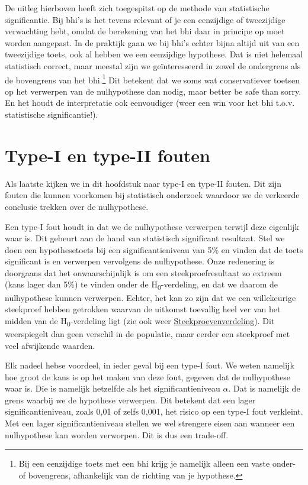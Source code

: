 \documentclass[
  letterpaper,
  DIV=11,
  numbers=noendperiod]{scrreprt}
\begin{document}
De uitleg hierboven heeft zich toegespitst op de methode van
statistische significantie. Bij bhi's is het tevens relevant of je een
eenzijdige of tweezijdige verwachting hebt, omdat de berekening van het
bhi daar in principe op moet worden aangepast. In de praktijk gaan we
bij bhi's echter bijna altijd uit van een tweezijdige toets, ook al
hebben we een eenzijdige hypothese. Dat is niet helemaal statistisch
correct, maar meestal zijn we geïnteresseerd in zowel de ondergrens als
de bovengrens van het bhi.\footnote{Bij een eenzijdige toets met een bhi
  krijg je namelijk alleen een vaste onder- of bovengrens, afhankelijk
  van de richting van je hypothese.} Dit betekent dat we soms wat
conservatiever toetsen op het verwerpen van de nulhypothese dan nodig,
maar better be safe than sorry. En het houdt de interpretatie ook
eenvoudiger (weer een win voor het bhi t.o.v. statistische
significantie!).

\section{Type-I en type-II fouten}\label{sec-eenzijdigtweezijdig}

Als laatste kijken we in dit hoofdstuk naar type-I en type-II fouten.
Dit zijn fouten die kunnen voorkomen bij statistisch onderzoek waardoor
we de verkeerde conclusie trekken over de nulhypothese.

Een type-I fout houdt in dat we de nulhypothese verwerpen terwijl deze
eigenlijk waar is. Dit gebeurt aan de hand van statistisch significant
resultaat. Stel we doen een hypothesetoets bij een significantieniveau
van 5\% en vinden dat de toets significant is en verwerpen vervolgens de
nulhypothese. Onze redenering is doorgaans dat het onwaarschijnlijk is
om een steekproefresultaat zo extreem (kans lager dan 5\%) te vinden
onder de H\textsubscript{0}-verdeling, en dat we daarom de nulhypothese
kunnen verwerpen. Echter, het kan zo zijn dat we een willekeurige
steekproef hebben getrokken waarvan de uitkomst toevallig heel ver van
het midden van de H\textsubscript{0}-verdeling ligt (zie ook weer
\hyperref[sec-steekproefcentraallimiet]{Steekproevenverdeling}). Dit
weerspiegelt dan geen verschil in de populatie, maar eerder een
steekproef met veel afwijkende waarden.

Elk nadeel hebse voordeel, in ieder geval bij een type-I fout. We weten
namelijk hoe groot de kans is op het maken van deze fout, gegeven dat de
nulhypothese waar is. Die is namelijk hetzelfde als het
significantieniveau \(\alpha\). Dat is namelijk de grens waarbij we de
hypothese verwerpen. Dit betekent dat een lager significantieniveau,
zoals 0,01 of zelfs 0,001, het risico op een type-I fout verkleint. Met
een lager significantieniveau stellen we wel strengere eisen aan wanneer
een nulhypothese kan worden verworpen. Dit is dus een trade-off.
\end{document}
